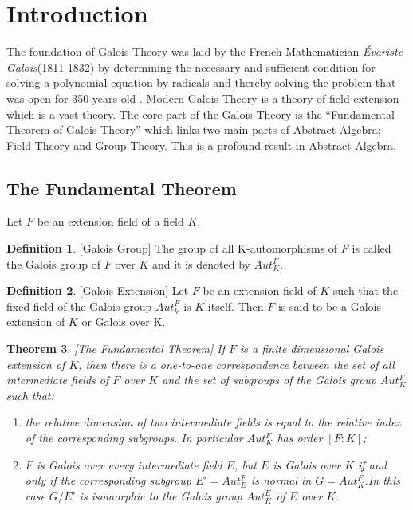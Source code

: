 \documentclass[11pt]{amsart}
\theoremstyle{plain}
\newtheorem{theorem}{Theorem}[section]
\theoremstyle{definition}
\newtheorem{definition}[theorem]{Definition}
\numberwithin{equation}{section}
\begin{document}
 \section{Introduction}
 The foundation of Galois Theory was laid by the French Mathematician \textit{Évariste Galois}(1811-1832) by determining the necessary and sufficient condition for solving a polynomial equation by radicals and thereby solving the problem that was open for 350 years old \cite{galois}. Modern Galois Theory is a theory of field extension which is a vast theory. The core-part of the Galois Theory is the ``Fundamental Theorem of Galois Theory'' \cite {hunger}  which links two main parts of Abstract Algebra; Field Theory and Group Theory. This is a profound result in Abstract Algebra.\\

 \subsection{The Fundamental Theorem}
 Let \(F\) be an extension field of a field \(K\).

 \begin{definition} \cite{hunger} [Galois Group]
  The group of all K-automorphisms of \(F\) is called the Galois group of \(F\) over \(K\) and it is denoted by \(Aut_K^F\).
\end{definition}

\begin{definition} \cite{hunger} [Galois Extension]
Let \(F\) be an extension field of \(K\) such that the fixed field of the Galois group \(Aut_k^F\) is \(K\) itself. Then \(F\) is said to be a Galois extension of \(K\) or Galois over K.
\end{definition}

\begin{theorem} \cite{hunger} [The Fundamental Theorem]
  If \(F\) is a finite dimensional Galois extension of \(K\), then there is a one-to-one correspondence between the set of all intermediate fields of \(F\) over \(K\) and the set of subgroups of the Galois group \(Aut_K^F\) such that:
  \begin{enumerate}
  \item[i)] the relative dimension of two intermediate fields is equal to the relative index of the corresponding subgroups. In particular \(Aut_K^F\) has order \([F:K]\);
  \item[ii)] \(F\) is Galois over every intermediate field \(E\), but \(E\) is Galois over \(K\) if and only if the corresponding subgroup \(E'= Aut_E^F\) is normal in \(G=Aut_K^F\).In this case \(G/E'\) is isomorphic to the Galois group \(Aut_K^E\) of \(E\) over \(K\).
  \end{enumerate}
\end{theorem}
\end{document}
